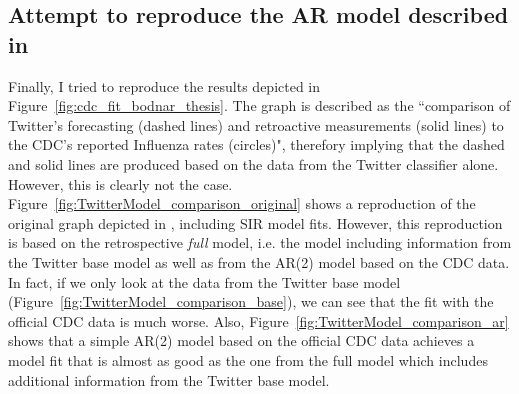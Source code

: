 \documentclass[11pt, a4paper,twoside]{report}\usepackage[]{graphicx}\usepackage[]{color}
\begin{document}
\subsection{Attempt to reproduce the AR model described in \cite{bodnar_data_2015}}
Finally, I tried to reproduce the results depicted in Figure~\ref{fig:cdc_fit_bodnar_thesis}. The graph is described as the ``comparison of Twitter's forecasting (dashed lines) and retroactive measurements (solid lines) to the CDC's reported Influenza rates (circles)", therefory implying that the dashed and solid lines are produced based on the data from the Twitter classifier alone. However, this is clearly not the case. Figure~\ref{fig:TwitterModel_comparison_original} shows a reproduction of the original graph depicted in \citep{bodnar_data_2015}, including SIR model fits. However, this reproduction is based on the retrospective \textit{full} model, i.e. the model including information from the Twitter base model as well as from the AR(2) model based on the CDC data. In fact, if we only look at the data from the Twitter base model (Figure~\ref{fig:TwitterModel_comparison_base}), we can see that the fit with the official CDC data is much worse. Also, Figure~\ref{fig:TwitterModel_comparison_ar} shows that a simple AR(2) model based on the official CDC data achieves a model fit that is almost as good as the one from the full model which includes additional information from the Twitter base model.
\end{document}
